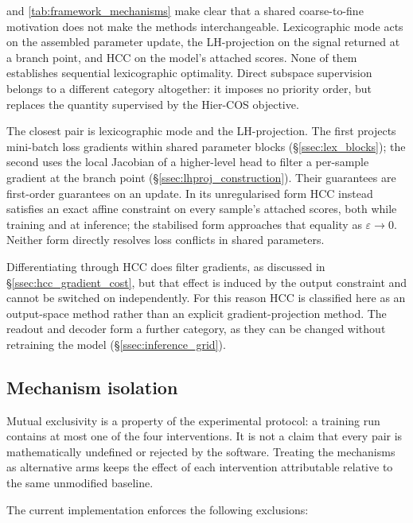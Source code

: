  and \cref{tab:framework_mechanisms} make clear
that a shared coarse-to-fine motivation does not make the methods
interchangeable. Lexicographic mode acts
on the assembled parameter update, the LH-projection on the signal returned at
a branch point, and HCC on the model's attached scores. None of them establishes
sequential lexicographic optimality. Direct subspace supervision belongs to a
different category altogether: it imposes no priority order, but replaces the
quantity supervised by the Hier-COS objective.

The closest pair is lexicographic mode and the LH-projection. The first projects
mini-batch loss gradients within shared parameter blocks
(\S\ref{ssec:lex_blocks}); the second uses the local Jacobian of a higher-level
head to filter a per-sample gradient at the branch point
(\S\ref{ssec:lhproj_construction}). Their guarantees are first-order guarantees
on an update. In its unregularised form HCC instead satisfies an exact affine
constraint on every sample's attached scores, both while training and at inference; the
stabilised form approaches that equality as $\varepsilon\to0$. Neither form
directly resolves loss conflicts in shared parameters.

Differentiating through HCC does filter gradients, as discussed in
\S\ref{ssec:hcc_gradient_cost}, but that effect is induced by the output
constraint and cannot be switched on independently. For this reason HCC is
classified here as an output-space method rather than an explicit
gradient-projection method. The readout and decoder form a further category, as
they can be changed without retraining the model
(\S\ref{ssec:inference_grid}).

\subsection{Mechanism isolation}
\label{ssec:design_axis}

Mutual exclusivity is a property of the experimental protocol: a training run
contains at most one of the four interventions. It is not a claim that every
pair is mathematically undefined or rejected by the software. Treating the
mechanisms as alternative arms keeps the effect of each intervention
attributable relative to the same unmodified baseline.

The current implementation enforces the following exclusions:

